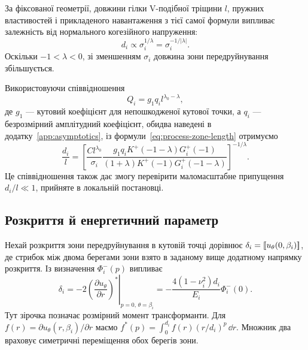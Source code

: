 За фіксованої геометрії, довжини гілки V-подібної тріщини $l$, пружних властивостей і прикладеного навантаження з тієї самої формули випливає залежність від нормального когезійного напруження:
\begin{equation*}
  d_i\propto \sigma_i^{1/\lambda}
  =\sigma_i^{-1/|\lambda|}.
\end{equation*}
Оскільки $-1<\lambda<0$, зі зменшенням $\sigma_i$ довжина зони передруйнування збільшується.

Використовуючи співвідношення
\begin{equation*}
  Q_i=g_1q_i l^{\lambda_0-\lambda},
\end{equation*}
де $g_1$ — кутовий коефіцієнт для непошкодженої кутової точки, а $q_i$ — безрозмірний амплітудний коефіцієнт, обидва наведені в додатку~\ref{app:asymptotics}, із формули~\eqref{eq:process-zone-length} отримуємо
\begin{equation}
\label{eq:normalized-process-zone-length}
  \frac{d_i}{l}=
  \left[
    \frac{Cl^{\lambda_0}}{\sigma_i}
    \frac{g_1q_iK^+(-1-\lambda)G_i^+(-1)}
    {(1+\lambda)K^+(-1)G_i^+(-1-\lambda)}
  \right]^{-1/\lambda}.
\end{equation}
Це співвідношення також дає змогу перевірити маломасштабне припущення $d_i/l\ll1$, прийняте в локальній постановці.

\subsection{Розкриття й енергетичний параметр}
\label{subsec:zone-parameters}

Нехай розкриття зони передруйнування в кутовій точці дорівнює $\delta_i=\left[\!\left[u_\theta(0,\beta_i)\right]\!\right]$, де стрибок між двома берегами зони взято в заданому вище додатному напрямку розкриття. Із визначення $\Phi_i^-(p)$ випливає
\begin{equation*}
  \delta_i
  =-2
    \left.
      \left(\frac{\partial u_\theta}{\partial r}\right)^*
    \right|_{p=0,\,\theta=\beta_i}
  =-\frac{4(1-\nu_i^2)d_i}{E_i}\Phi_i^-(0).
\end{equation*}
Тут зірочка позначає розмірний момент трансформанти. Для $f(r)=\partial u_\theta(r,\beta_i)/\partial r$ маємо $f^*(p)=\int_0^{d_i}f(r)(r/d_i)^p\,\dd r$. Множник два враховує симетричні переміщення обох берегів зони.

